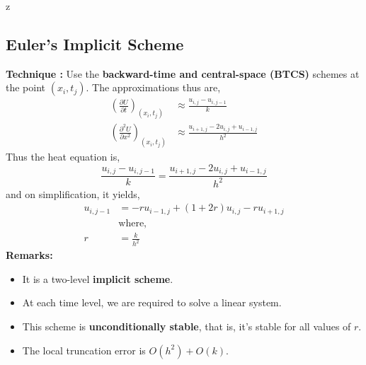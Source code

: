 z\documentclass[a4paper,12pt,twoside]{book}
\newcommand{\nll}[0]{\newline\newline}
\newcommand{\pder}[2]{\frac{\partial #1}{\partial #2}}
\begin{document}
\subsection{Euler's Implicit Scheme}
\textbf{Technique : }Use the \textbf{backward-time and central-space (BTCS)} schemes at the point $(x_i,t_j)$.
\nll
The approximations thus are,
\begin{equation}
    \begin{split}
        \left(\pder{U}{t}\right)_{(x_i,t_j)} &\approx \frac{u_{i,j} - u_{i,j-1}}{k}\\
        \left( \pder{^2 U}{x^2} \right)_{(x_i,t_j)} &\approx \frac{u_{i+1,j} - 2u_{i,j} + u_{i-1,j}}{h^2}
    \end{split}
\end{equation}
Thus the heat equation is,
\begin{equation*}
     \frac{u_{i,j} - u_{i,j-1}}{k} = \frac{u_{i+1,j} - 2u_{i,j} + u_{i-1,j}}{h^2}
\end{equation*}
and on simplification, it yields,
\begin{equation}
\begin{split}
    u_{i,j-1} &= -ru_{i-1,j} + (1+2r)u_{i,j} - ru_{i+1,j} \\
    &\text{where,}\\
    r &= \frac{k}{h^2}
    \end{split}
\end{equation}
\textbf{Remarks:}
\begin{itemize}
    \item{It is a two-level \textbf{implicit scheme}.}
    \item{At each time level, we are required to solve a linear system.}
    \item{This scheme is \textbf{unconditionally stable}, that is, it's stable for all values of $r$.}
    \item{The local truncation error is $O(h^2) + O(k)$.}
\end{itemize}
\end{document}
